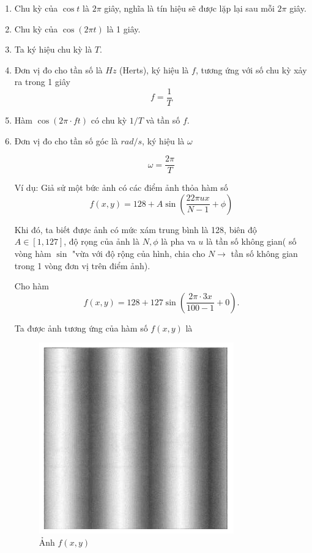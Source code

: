 \documentclass[12pt,a4paper]{report}
\numberwithin{equation}{section}
\theoremstyle{definition} %
\begin{document}
\begin{enumerate}
    \item Chu kỳ của $\cos t$ là $2\pi$ giây, nghĩa là tín hiệu sẽ được lặp lại sau mỗi $2\pi$ giây.

    \item Chu kỳ của $\cos(2\pi t)$ là 1 giây.

\item Ta ký hiệu chu kỳ là $T$.

\item Đơn vị đo cho tần số là $Hz$ (Herts), ký hiệu là $f$, tương ứng với số chu kỳ xảy ra trong 1 giây
$$f=\dfrac{1}{T}$$

\item Hàm $\cos(2\pi \cdot ft)$ có chu kỳ $1/T$ và tần số $f$.

\item Đơn vị đo cho tần số góc là $rad/s$, ký hiệu là $\omega$

$$\omega = \dfrac{2\pi}{T}$$

Ví dụ: Giả sử một bức ảnh có các điểm ảnh thỏa hàm số
$$f(x,y)=128+A \sin \left(\dfrac{22\pi u x}{N-1}+\phi\right)$$

Khi đó, ta biết được ảnh có mức xám trung bình là 128, biên độ $A \in [1,127]$, độ rọng của ảnh là $N, \phi$ là pha va $u$ là tần số không gian( số vòng hàm $\sin $ "vừa với độ rộng của hình, chia cho $N \rightarrow $ tần số không gian trong 1 vòng đơn vị trên  điểm ảnh).

Cho hàm
$$f(x,y)=128+127 \sin \left(\dfrac{2\pi \cdot 3x}{100-1}+0\right).$$

Ta được ảnh tương ứng của hàm số $f(x,y)$ là

\begin{figure}[H]
    \centering
\includegraphics[width=0.5\linewidth]{img/Screenshot 2025-10-01 132803.png}
    \caption{Ảnh $f(x,y)$}
		\label{fig11}
\end{figure}

\end{enumerate}
\end{document}
